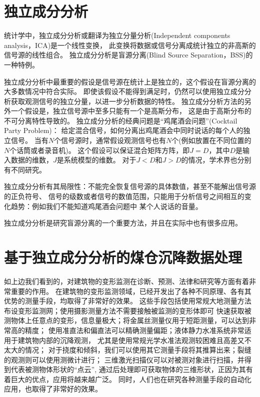 \section{独立成分分析}
统计学中，独立成分分析或翻译为独立分量分析(Independent components analysis，ICA)是一个线性变换，
此变换将数据或信号分离成统计独立的非高斯的信号源的线性组合。
独立成分分析是盲源分离(Blind Source Separation，BSS)的一种特例。

独立成分分析中最重要的假设是信号源在统计上是独立的，这个假设在盲源分离的大多数情况中符合实际。
即使该假设不能得到满足时，仍然可以使用独立成分分析获取观测信号的独立分量，以进一步分析数据的特性。
独立成分分析方法的另外一个假设是，独立信号源中至多只能有一个是高斯分布，
这是由于高斯分布的不可分离特性导致的。
独立成分分析的经典问题是“鸡尾酒会问题”(Cocktail Party Problem)：
给定混合信号，如何分离出鸡尾酒会中同时说话的每个人的独立信号。
当有$N$个信号源时，通常假设观测信号也有$N$个(例如放置在不同位置的$N$个话筒或者录音机)。
这个假设可以保证混合矩阵方阵，即$J = D$，其中$D$是输入数据的维数，$J$是系统模型的维数。
对于$J < D$和$J > D$的情况，学术界也分别有不同研究。

独立成分分析有其局限性：不能完全恢复信号源的具体数值，甚至不能解出信号源的正负符号、
信号的级数或者信号的数值范围，只能用于分析信号之间相互的变化趋势：例如我们不能知道鸡尾酒会问题中
某个人说话的音量。

独立成分分析是研究盲源分离的一个重要方法，并且在实际中也有很多应用。

\section{基于独立成分分析的煤仓沉降数据处理}
如上边我们看到的，对建筑物的变形监测在诊断、预测、法律和研究等方面有着非常重要的作用。
在建筑物的变形监测领域，已经开发出了各种不同原理、各有其优势的测量手段，均取得了非常好的效果。
这些手段包括使用常规大地测量方法布设变形监测网；使用摄影测量方法不需要接触被监测的变形体即可
快速获取被测物体上任意点的变形，信息量极大；将金属丝测量仪用于短距测量，可以达到非常高的精度；
使用准直法和偏直法可以精确测量偏距；液体静力水准系统非常适用于建筑物内部的沉降观测，
尤其是使用常规光学水准法观测较困难且高差又不太大的情况；
对于挠度和倾斜，我们可以使用其它测量手段将其推算出来；裂缝的观测则可以使用测微计进行；
三维激光扫描仪可以对被测对象进行扫描，并得到代表被测物体形状的“点云”,
通过后处理即可获取物体的三维形状，正因为其有着巨大的优点，应用将越来越广泛。
同时，人们也在研究各种测量手段的自动化应用，也取得了非常好的效果。

